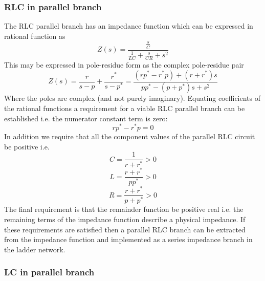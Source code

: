 \subsubsection{RLC in parallel branch}

The RLC parallel branch has an impedance function which can be expressed in rational function as
\begin{equation} 
Z\left(s\right)=\frac{\frac{s}{C}}{\frac{1}{L C} + \frac{s}{C R} + s^2}
\end{equation}
This may be expressed in pole-residue form as the complex pole-residue pair
\begin{equation} 
Z\left(s\right)= \frac{r}{s-p}+\frac{r^*}{s-p^*}=\frac{\left(rp^*-r^*p\right)+\left( r+r^*\right)s}{pp^*-\left( p+p^*\right)s+s^2}
\end{equation}
Where the poles are complex (and not purely imaginary). Equating coefficients of the rational functions a requirement for a viable RLC parallel branch can be established i.e. the numerator constant term is zero:
\begin{equation} 
rp^*-r^*p=0
\end{equation}
In addition we require that all the component values of the parallel RLC circuit be positive i.e.
\begin{equation} 
C=\frac{1}{r+r^*}>0
\end{equation}
\begin{equation} 
L=\frac{r+r^*}{pp^*}>0
\end{equation}
\begin{equation} 
R=\frac{r+r^*}{p+p^*}>0
\end{equation}
The final requirement is that the remainder function be positive real i.e. the remaining terms of the impedance function describe a physical impedance. If these requirements are satisfied then a parallel RLC branch can be extracted from the impedance function and implemented as a series impedance branch in the ladder network. 

\subsubsection{LC in parallel branch}

